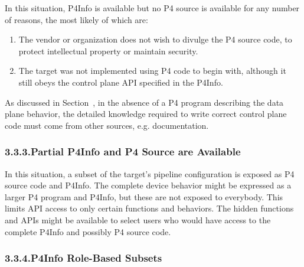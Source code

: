 \documentclass[11pt]{article}
\begin{document}
{%
\noindent{}In this situation, P4Info is available but no P4 source is available for any
number of reasons, the most likely of which are:%

\begin{enumerate}%

\item{}
The vendor or organization does not wish to divulge the P4 source code, to
protect intellectual property or maintain security.%

\item{}
The target was not implemented using P4 code to begin with, although it still
obeys the control plane API specified in the P4Info.%
\end{enumerate}%

\noindent{}As discussed in Section~, in the
absence of a P4 program describing the data plane behavior, the detailed
knowledge required to write correct control plane code must come from other
sources, e.g. documentation.%

\subsubsection{3.3.3.\hspace*{0.5em}Partial P4Info and P4 Source are Available}\label{sec-partial-p4info-and-p4-source-are-available}%

\noindent{}In this situation, a subset of the target's pipeline configuration is exposed as
P4 source code and P4Info. The complete device behavior might be expressed as a
larger P4 program and P4Info, but these are not exposed to everybody. This
limits API access to only certain functions and behaviors. The hidden functions
and APIs might be available to select users who would have access to the
complete P4Info and possibly P4 source code.%

\subsubsection{3.3.4.\hspace*{0.5em}P4Info Role-Based Subsets}\label{sec-p4info-role-based-subsets}%

}
\end{document}
